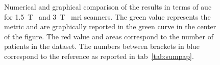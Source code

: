 \begin{figure}
{
 }
  \caption[Results comparison from the state-of-the-art in terms of \acs*{auc}.]{Numerical and graphical comparison of the results in terms of \acs*{auc} for \SI{1.5}{\tesla}~ and \SI{3}{\tesla}~ \acs*{mri} scanners. The {\color{semiAuto}green} value represents the metric and are graphically reported in the {\color{semiAuto}green} curve in the center of the figure. The {\color{red}red} value and areas correspond to the number of patients in the dataset. The numbers between brackets in {blue\color{blue}} correspond to the reference as reported in \acs{tab}~\ref{tab:sumpap}.}
  \label{fig:auc}
\end{figure}

